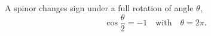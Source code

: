 \documentclass{article}
\begin{document}
A spinor changes sign under a full rotation of angle $\theta$,
\begin{equation}
\cos\frac{\theta}{2} = -1 \quad \text{with} \quad \theta = 2\pi .
\label{eq:full}
\end{equation}
\end{document}
